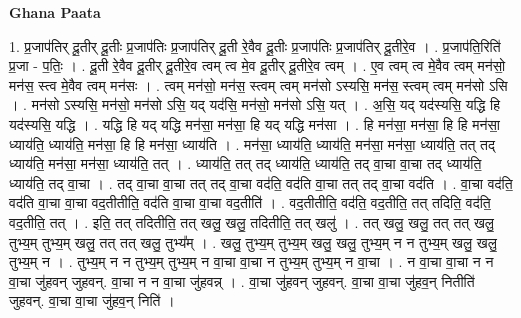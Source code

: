 \documentclass[17pt]{extarticle}
\begin{document}
\textbf{Ghana Paata } \newline

1. प्र॒जाप॑तिर् दू॒तीर् दू॒तीः प्र॒जाप॑तिः प्र॒जाप॑तिर् दू॒ती रे॒वैव दू॒तीः प्र॒जाप॑तिः प्र॒जाप॑तिर् दू॒तीरे॒व । . प्र॒जाप॑ति॒रिति॑ प्र॒जा - प॒तिः॒ । . दू॒ती रे॒वैव दू॒तीर् दू॒तीरे॒व त्वम् त्व मे॒व दू॒तीर् दू॒तीरे॒व त्वम् । . ए॒व त्वम् त्व मे॒वैव त्वम् मन॑सो॒ मन॑स॒ स्त्व मे॒वैव त्वम् मन॑सः । . त्वम् मन॑सो॒ मन॑स॒ स्त्वम् त्वम् मन॑सो ऽस्यसि॒ मन॑स॒ स्त्वम् त्वम् मन॑सो ऽसि । . मन॑सो ऽस्यसि॒ मन॑सो॒ मन॑सो ऽसि॒ यद् यद॑सि॒ मन॑सो॒ मन॑सो ऽसि॒ यत् । . अ॒सि॒ यद् यद॑स्यसि॒ यद्धि हि यद॑स्यसि॒ यद्धि । . यद्धि हि यद् यद्धि मन॑सा॒ मन॑सा॒ हि यद् यद्धि मन॑सा । . हि मन॑सा॒ मन॑सा॒ हि हि मन॑सा॒ ध्याय॑ति॒ ध्याय॑ति॒ मन॑सा॒ हि हि मन॑सा॒ ध्याय॑ति । . मन॑सा॒ ध्याय॑ति॒ ध्याय॑ति॒ मन॑सा॒ मन॑सा॒ ध्याय॑ति॒ तत् तद् ध्याय॑ति॒ मन॑सा॒ मन॑सा॒ ध्याय॑ति॒ तत् । . ध्याय॑ति॒ तत् तद् ध्याय॑ति॒ ध्याय॑ति॒ तद् वा॒चा वा॒चा तद् ध्याय॑ति॒ ध्याय॑ति॒ तद् वा॒चा । . तद् वा॒चा वा॒चा तत् तद् वा॒चा वद॑ति॒ वद॑ति वा॒चा तत् तद् वा॒चा वद॑ति । . वा॒चा वद॑ति॒ वद॑ति वा॒चा वा॒चा वद॒तीतीति॒ वद॑ति वा॒चा वा॒चा वद॒तीति॑ । . वद॒तीतीति॒ वद॑ति॒ वद॒तीति॒ तत् तदिति॒ वद॑ति॒ वद॒तीति॒ तत् । . इति॒ तत् तदितीति॒ तत् खलु॒ खलु॒ तदितीति॒ तत् खलु॑ । . तत् खलु॒ खलु॒ तत् तत् खलु॒ तुभ्य॒म् तुभ्य॒म् खलु॒ तत् तत् खलु॒ तुभ्य᳚म् । . खलु॒ तुभ्य॒म् तुभ्य॒म् खलु॒ खलु॒ तुभ्य॒म् न न तुभ्य॒म् खलु॒ खलु॒ तुभ्य॒म् न । . तुभ्य॒म् न न तुभ्य॒म् तुभ्य॒म् न वा॒चा वा॒चा न तुभ्य॒म् तुभ्य॒म् न वा॒चा । . न वा॒चा वा॒चा न न वा॒चा जु॑हवन् जुहवन्. वा॒चा न न वा॒चा जु॑हवन्न् । . वा॒चा जु॑हवन् जुहवन्. वा॒चा वा॒चा जु॑हव॒न् नितीति॑ जुहवन्. वा॒चा वा॒चा जु॑हव॒न् निति॑ । \newline
\end{document}
